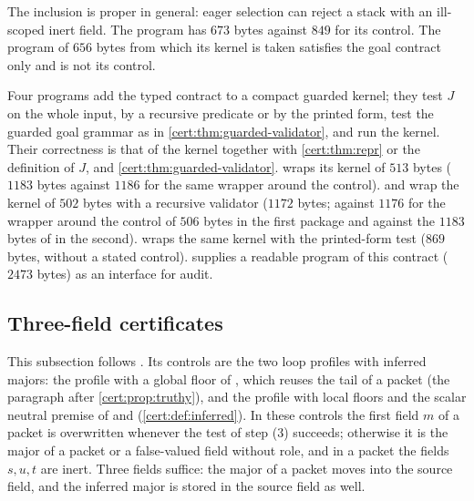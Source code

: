 The inclusion is proper in general: eager selection can reject a stack with
an ill-scoped inert field. The program has $673$ bytes against $849$ for its
control. The program of $656$ bytes from which its kernel is taken satisfies
the goal contract only and is not its control.

Four programs add the typed contract to a compact guarded kernel; they test
$J$ on the whole input, by a recursive predicate or by the printed form, test
the guarded goal grammar as in \cref{cert:thm:guarded-validator}, and run the
kernel. Their correctness is that of the kernel together with
\cref{cert:thm:repr} or the definition of $J$, and
\cref{cert:thm:guarded-validator}.  wraps its kernel of
$513$ bytes ($1183$ bytes against $1186$ for the same wrapper around the
control).  and  wrap the
kernel of $502$ bytes with a recursive validator ($1172$ bytes; against $1176$
for the wrapper around the control of $506$ bytes in the first package and
against the $1183$ bytes of  in the second).
 wraps the same kernel with the printed-form test
($869$ bytes, without a stated control).  supplies a
readable program of this contract ($2473$ bytes) as an interface for audit.

\subsection{Three-field certificates}\label{cert:sec:three-field}

This subsection follows . Its controls are the two loop
profiles with inferred majors: the profile with a global floor of
, which reuses the tail of a packet (the paragraph
after \cref{cert:prop:truthy}), and the profile with local floors and the
scalar neutral premise of  and 
(\cref{cert:def:inferred}). In these controls the first field $m$ of a packet
is overwritten whenever the test of step (3) succeeds; otherwise it is the
major of a  packet or a false-valued field without role, and in
a  packet the fields $s,u,t$ are inert. Three fields suffice:
the major of a  packet moves into the source field, and the
inferred major is stored in the source field as well.

